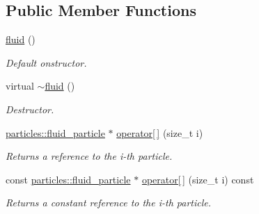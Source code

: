 \subsection*{Public Member Functions}
\begin{DoxyCompactItemize}
\item 
\mbox{\label{classphysim_1_1fluids_1_1fluid_accaba6072529138d6ba9d167ea4febbf}} 
\hyperlink{classphysim_1_1fluids_1_1fluid_accaba6072529138d6ba9d167ea4febbf}{fluid} ()
\begin{DoxyCompactList}\small\item\em Default onstructor. \end{DoxyCompactList}\item 
\mbox{\label{classphysim_1_1fluids_1_1fluid_ad4e5dc8a4530a41727958ad689ce83fb}} 
virtual \hyperlink{classphysim_1_1fluids_1_1fluid_ad4e5dc8a4530a41727958ad689ce83fb}{$\sim$fluid} ()
\begin{DoxyCompactList}\small\item\em Destructor. \end{DoxyCompactList}\item 
\mbox{\label{classphysim_1_1fluids_1_1fluid_ac26ad353b668110caa4328aa3b2a9208}} 
\hyperlink{classphysim_1_1particles_1_1fluid__particle}{particles\+::fluid\+\_\+particle} $\ast$ \hyperlink{classphysim_1_1fluids_1_1fluid_ac26ad353b668110caa4328aa3b2a9208}{operator\mbox{[}$\,$\mbox{]}} (size\+\_\+t i)
\begin{DoxyCompactList}\small\item\em Returns a reference to the {\itshape i-\/th} particle. \end{DoxyCompactList}\item 
\mbox{\label{classphysim_1_1fluids_1_1fluid_a3e7640bf098662ce95378649eb43c016}} 
const \hyperlink{classphysim_1_1particles_1_1fluid__particle}{particles\+::fluid\+\_\+particle} $\ast$ \hyperlink{classphysim_1_1fluids_1_1fluid_a3e7640bf098662ce95378649eb43c016}{operator\mbox{[}$\,$\mbox{]}} (size\+\_\+t i) const
\begin{DoxyCompactList}\small\item\em Returns a constant reference to the {\itshape i-\/th} particle. \end{DoxyCompactList}\item 

\end{DoxyCompactItemize}
